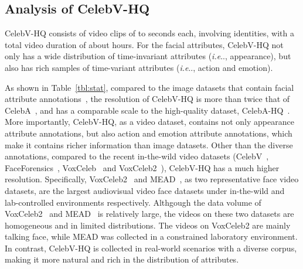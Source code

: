 \documentclass[runningheads]{llncs}
\makeatletter
\DeclareRobustCommand\onedot{\futurelet\@let@token\@onedot}
\def\@onedot{\ifx\@let@token.\else.\null\fi\xspace}
\def\ie{\emph{i.e}\onedot} \def\Ie{\emph{I.e}\onedot}
\makeatother
\begin{document}
\subsection{Analysis of CelebV-HQ}
CelebV-HQ consists of  video clips of  to  seconds each, involving  identities, with a total video duration of about  hours. For the facial attributes, CelebV-HQ not only has a wide distribution of time-invariant attributes (\ie, appearance), but also has rich samples of time-variant attributes (\ie, action and emotion).


As shown in Table~\ref{tbl:stat}, compared to the image datasets that contain facial attribute annotations~\cite{celeba15,celebahq}, the resolution of CelebV-HQ is more than twice that of CelebA~\cite{celebahq}, and has a comparable scale to the high-quality dataset, CelebA-HQ~\cite{celeba15}. 
More importantly, CelebV-HQ, as a video dataset, contains not only appearance attribute annotations, but also action and emotion attribute annotations, which make it contains richer information than image datasets. Other than the diverse annotations, compared to the recent in-the-wild video datasets (CelebV~\cite{wayne2018reenactgan}, FaceForensics~\cite{faceforensics}, VoxCeleb~\cite{vox17} and VoxCeleb2~\cite{vox2}), CelebV-HQ has a much higher resolution.
Specifically, VoxCeleb2~\cite{vox2} and MEAD~\cite{mead}, as two representative face video datasets, are the largest audiovisual video face datasets under in-the-wild and lab-controlled environments respectively.
Althgough the data volume of VoxCeleb2~\cite{vox2} and MEAD~\cite{mead} is relatively large, the videos on these two datasets are homogeneous and in limited distributions. The videos on VoxCeleb2 are mainly talking face, while MEAD was collected in a constrained laboratory environment. In contrast, CelebV-HQ is collected in real-world scenarios with a diverse corpus, making it more natural and rich in the distribution of attributes. 
\end{document}
